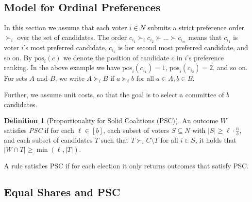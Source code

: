 \documentclass[10pt]{scrartcl}
\renewcommand*{\geq}{\geqslant}
\newcommand{\myemph}[1]{{\color{winered}\emph{#1}}}
\theoremstyle{definition}
\newtheorem{definition}{Definition}
\theoremstyle{plain}
\newcommand{\pos}{{{{\mathrm{pos}}}}}
\begin{document}
\subsection{Model for Ordinal Preferences}

In this section we assume that each voter $i \in N$ submits a strict preference order $\succ_i$ over the set of candidates. The order $c_{i_1} \succ_i c_{i_2} \succ \ldots \succ c_{i_m}$ means that $c_{i_1}$ is voter $i$'s most preferred candidate, $c_{i_2}$ is her second most preferred candidate, and so on. By $\pos_i(c)$ we denote the position of candidate $c$ in $i$'s preference ranking. In the above example we have $\pos_i(c_{i_1}) = 1$, $\pos_i(c_{i_2}) = 2$, and so on. For sets $A$ and $B$, we write $A \succ_i B$ if $a \succ_i b$ for all $a \in A,b \in B$.

Further, we assume unit costs, so that the goal is to select a committee of $b$ candidates.

\begin{definition}[Proportionality for Solid Coalitions (PSC)]\label{def:psc}
	An outcome $W$ satisfies \myemph{PSC} if for each $\ell \in [b]$, each subset of voters $S \subseteq N$ with $|S| \geq \ell \cdot \frac{n}{b}$, and each subset of candidates $T$ such that $T \succ_i C \setminus T$ for all $i \in S$, it holds that $|W \cap T| \geq \min(\ell, |T|)$.
	
	A rule satisfies PSC if for each election it only returns outcomes that satisfy PSC.
\end{definition}

\subsection{Equal Shares and PSC}
\end{document}
